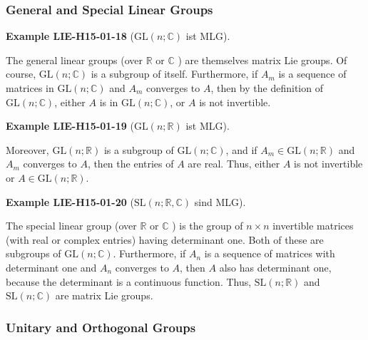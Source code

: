 \documentclass[10pt, letterpaper]{article}
\newcommand{\R}{\mathbb{R}}
\newcommand{\C}{\mathbb{C}}
\newcommand{\GL}{\mathrm{GL}}
\newcommand{\SL}{\mathrm{SL}}
\newcommand{\CustomHeading}[3]{%
  \par\medskip\noindent%
  \textbf{#1 #2} \textnormal{(#3)}.\enskip%
}
\newenvironment{EXA}[2]{\begin{unitbox}\CustomHeading{Example}{#1}{#2}}{\end{unitbox}}
\begin{document}
\subsubsection*{General and Special Linear Groups}


\begin{EXA}{LIE-H15-01-18}{$\GL(n;\C)$ ist MLG}
The general linear groups (over $\mathbb{R}$ or $\mathbb{C}$ ) are themselves matrix Lie groups. Of course, $\mathrm{GL}(n ; \mathbb{C})$ is a subgroup of itself. Furthermore, if $A_{m}$ is a sequence of matrices in $\mathrm{GL}(n ; \mathbb{C})$ and $A_{m}$ converges to $A$, then by the definition of $\mathrm{GL}(n ; \mathbb{C})$, either $A$ is in $\mathrm{GL}(n ; \mathbb{C})$, or $A$ is not invertible.
\end{EXA}

\begin{EXA}{LIE-H15-01-19}{$\GL(n;\R)$ ist MLG}
Moreover, $\mathrm{GL}(n ; \mathbb{R})$ is a subgroup of $\mathrm{GL}(n ; \mathbb{C})$, and if $A_{m} \in \mathrm{GL}(n ; \mathbb{R})$ and $A_{m}$ converges to $A$, then the entries of $A$ are real. Thus, either $A$ is not invertible or $A \in \mathrm{GL}(n ; \mathbb{R})$.
\end{EXA}

\begin{EXA}{LIE-H15-01-20}{$\SL(n;\R,\C)$ sind MLG}
The special linear group (over $\mathbb{R}$ or $\mathbb{C}$ ) is the group of $n \times n$ invertible matrices (with real or complex entries) having determinant one. Both of these are subgroups of $\mathrm{GL}(n ; \mathbb{C})$. Furthermore, if $A_{n}$ is a sequence of matrices with determinant one and $A_{n}$ converges to $A$, then $A$ also has determinant one, because the determinant is a continuous function. Thus, $\mathrm{SL}(n ; \mathbb{R})$ and $\mathrm{SL}(n ; \mathbb{C})$ are matrix Lie groups.
\end{EXA}

\subsubsection*{Unitary and Orthogonal Groups}
\end{document}
